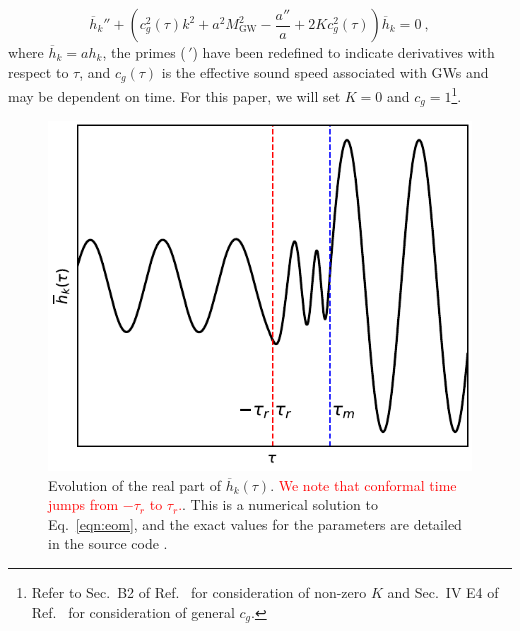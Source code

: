 \documentclass[prd,twocolumn,aps,psfig,nofootinbib,nobibnotes,superscriptaddress,preprintnumbers,times]{revtex4-2}
\def\red{\textcolor{red}}
\begin{document}
\begin{equation}\label{eqn:eom}
    \overline{h}_k'' + \left(c_g^2(\tau) k^2 + a^2 M_\text{GW}^2 - \frac{a''}{a} + 2Kc_g^2(\tau)\right)\overline{h}_k = 0 \ ,
\end{equation}
where $\overline{h}_k = ah_k$, the primes ($\,'$) have been redefined to indicate derivatives with respect to $\tau$, and $c_g(\tau)$ is the effective sound speed associated with GWs and may be dependent on time. For this paper, we will set $K = 0$ and $c_g = 1$\footnote{Refer to Sec.\ B2 of Ref.\ \cite{Gumrukcuoglu:2012wt} for consideration of non-zero $K$ and Sec.\ IV E4 of Ref.\ \cite{Gumrukcuoglu:2012wt} for consideration of general $c_g$.}.

\begin{figure}[t]
\centering
\includegraphics[scale=0.75]{fig1.pdf}
\caption{Evolution of the real part of $\overline{h}_k(\tau)$. \red{We note that conformal time jumps from $-\tau_r$ to $\tau_r$.}. This is a numerical solution to Eq.\ \ref{eqn:eom}, and the exact values for the parameters are detailed in the source code \cite{GH}.}
 \label{fig:mode}
\end{figure}
\end{document}
